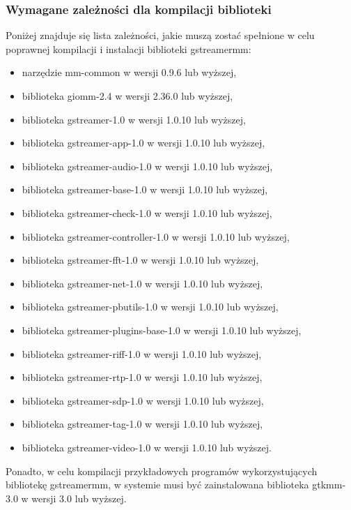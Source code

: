 \documentclass[12pt]{article}
\begin{document}
\subsubsection{Wymagane zależności dla kompilacji biblioteki}
Poniżej znajduje się lista zależności, jakie muszą zostać spełnione w celu poprawnej kompilacji i instalacji biblioteki gstreamermm:
\begin{itemize}
  \setlength{\itemsep}{0em}
\item narzędzie mm-common w wersji 0.9.6 lub wyższej,
\item biblioteka giomm-2.4 w wersji 2.36.0 lub wyższej,
\item biblioteka gstreamer-1.0 w wersji 1.0.10 lub wyższej,
\item biblioteka gstreamer-app-1.0 w wersji 1.0.10 lub wyższej,
\item biblioteka gstreamer-audio-1.0 w wersji 1.0.10 lub wyższej,
\item biblioteka gstreamer-base-1.0 w wersji 1.0.10 lub wyższej,
\item biblioteka gstreamer-check-1.0 w wersji 1.0.10 lub wyższej,
\item biblioteka gstreamer-controller-1.0 w wersji 1.0.10 lub wyższej,
\item biblioteka gstreamer-fft-1.0 w wersji 1.0.10 lub wyższej,
\item biblioteka gstreamer-net-1.0 w wersji 1.0.10 lub wyższej,
\item biblioteka gstreamer-pbutils-1.0 w wersji 1.0.10 lub wyższej,
\item biblioteka gstreamer-plugins-base-1.0 w wersji 1.0.10 lub wyższej,
\item biblioteka gstreamer-riff-1.0 w wersji 1.0.10 lub wyższej,
\item biblioteka gstreamer-rtp-1.0 w wersji 1.0.10 lub wyższej,
\item biblioteka gstreamer-sdp-1.0 w wersji 1.0.10 lub wyższej,
\item biblioteka gstreamer-tag-1.0 w wersji 1.0.10 lub wyższej,
\item biblioteka gstreamer-video-1.0 w wersji 1.0.10 lub wyższej.
\end{itemize}
Ponadto, w celu kompilacji przykładowych programów wykorzystujących bibliotekę gstreamermm, w systemie musi być zainstalowana biblioteka gtkmm-3.0 w wersji 3.0 lub wyższej.
\end{document}
